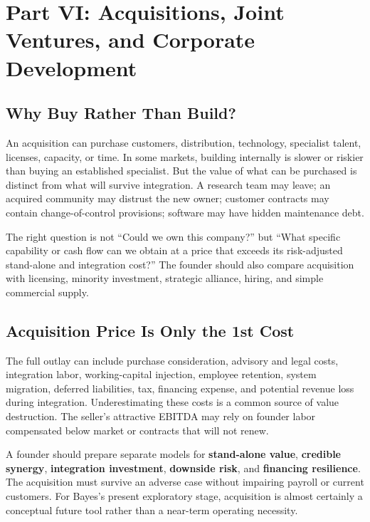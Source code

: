 \section*{Part VI: Acquisitions, Joint Ventures, and Corporate Development}
\label{sec:part6_acquisitions_joint_ventures_corporate_development}

\subsection{Why Buy Rather Than Build?}
\label{sec:why_buy_rather_than_build}

An acquisition can purchase customers, distribution, technology, specialist talent, licenses, capacity, or time. In some markets, building internally is slower or riskier than buying an established specialist. But the value of what can be purchased is distinct from what will survive integration. A research team may leave; an acquired community may distrust the new owner; customer contracts may contain change-of-control provisions; software may have hidden maintenance debt.

The right question is not ``Could we own this company?'' but ``What specific capability or cash flow can we obtain at a price that exceeds its risk-adjusted stand-alone and integration cost?'' The founder should also compare acquisition with licensing, minority investment, strategic alliance, hiring, and simple commercial supply.

\subsection{Acquisition Price Is Only the 1st Cost}
\label{sec:acquisition_price_first_cost}

The full outlay can include purchase consideration, advisory and legal costs, integration labor, working-capital injection, employee retention, system migration, deferred liabilities, tax, financing expense, and potential revenue loss during integration. Underestimating these costs is a common source of value destruction. The seller's attractive EBITDA may rely on founder labor compensated below market or contracts that will not renew.

A founder should prepare separate models for \textbf{stand-alone value}, \textbf{credible synergy}, \textbf{integration investment}, \textbf{downside risk}, and \textbf{financing resilience}. The acquisition must survive an adverse case without impairing payroll or current customers. For Bayes's present exploratory stage, acquisition is almost certainly a conceptual future tool rather than a near-term operating necessity.

